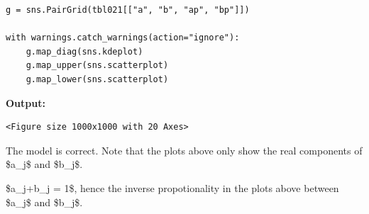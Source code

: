 \documentclass{article}
\begin{document}
\begin{lstlisting}
g = sns.PairGrid(tbl021[["a", "b", "ap", "bp"]])

with warnings.catch_warnings(action="ignore"):
    g.map_diag(sns.kdeplot)
    g.map_upper(sns.scatterplot)
    g.map_lower(sns.scatterplot)\end{lstlisting}

\textbf{Output:}\begin{verbatim}
<Figure size 1000x1000 with 20 Axes>
\end{verbatim}

The model is correct. Note that the plots above only show the real components of \$a\_j\$ and \$b\_j\$. 

\$a\_j+b\_j = 1\$, hence the inverse propotionality in the plots above between \$a\_j\$ and \$b\_j\$.
\end{document}
